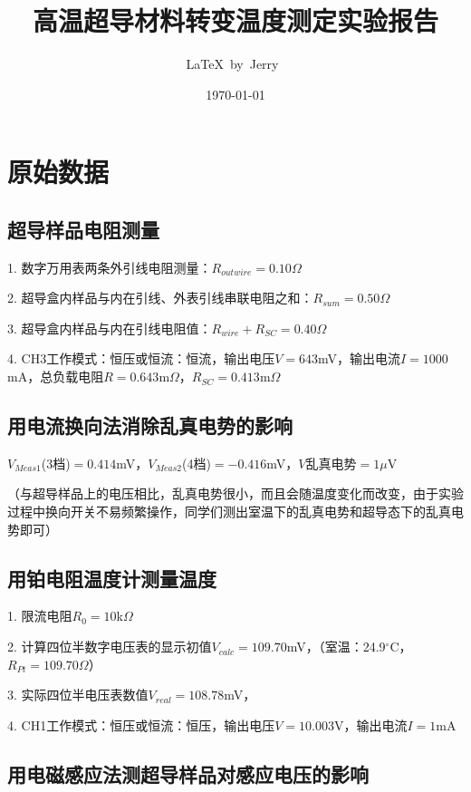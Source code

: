 \documentclass[UTF8]{ctexart}
\title{高温超导材料转变温度测定实验报告}
\author{\LaTeX\ by\ Jerry\ }
\date{\today}
\begin{document}
\fancyfoot[C]{\thepage}

\maketitle
\tableofcontents
\newpage

\section{原始数据}

    \subsection{超导样品电阻测量}

    1. 数字万用表两条外引线电阻测量：$R_{outwire}=0.10\Omega$

    2. 超导盒内样品与内在引线、外表引线串联电阻之和：$R_{sum}=0.50\Omega$

    3. 超导盒内样品与内在引线电阻值：$R_{wire}+R_{SC}=0.40\Omega$

    4. CH3工作模式：恒压或恒流：恒流，输出电压$V=643$mV，输出电流$I=1000$mA，总负载电阻$R=0.643$m$\Omega$，$R_{SC}=0.413$m$\Omega$

    \subsection{用电流换向法消除乱真电势的影响}

    $V_{Meas1}$(3档)$=0.414$mV，$V_{Meas2}$(4档)$=-0.416$mV，$V$乱真电势$=1\mu$V

    （与超导样品上的电压相比，乱真电势很小，而且会随温度变化而改变，由于实验过程中换向开关不易频繁操作，同学们测出室温下的乱真电势和超导态下的乱真电势即可）

    \subsection{用铂电阻温度计测量温度}

    1. 限流电阻$R_0=10$k$\Omega$

    2. 计算四位半数字电压表的显示初值$V_{calc}=109.70$mV，（室温：24.9$^{\circ}$C，$R_{Pt}=109.70\Omega$）

    3. 实际四位半电压表数值$V_{real}=108.78$mV，

    4. CH1工作模式：恒压或恒流：恒压，输出电压$V=10.003$V，输出电流$I=1$mA

    \subsection{用电磁感应法测超导样品对感应电压的影响}
\end{document}
